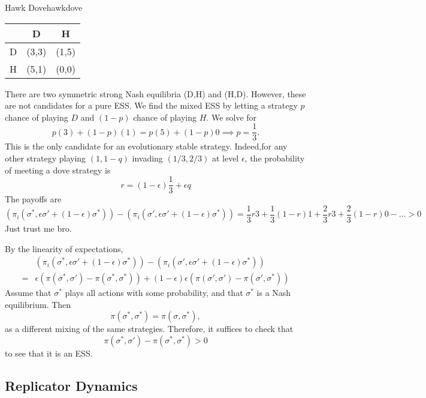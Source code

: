 \begin{aexample}{Hawk Dove}{hawkdove}
    \begin{center}
        \begin{tabular}{|c|c c|} 
            \hline &D& H \\
            
            \hline
            D&(3,3)&(1,5)\\
            \hline H&(5,1)&(0,0)
            \\ \hline
        \end{tabular}
    \end{center}

    There are two symmetric strong Nash equilibria (D,H) and (H,D). However, these are not candidates for a pure ESS. We find the mixed ESS by letting a strategy $p$ chance of playing $D$ and $(1-p)$ chance of playing $H$. We solve for \[
    p(3)+(1-p)(1)= p(5)+(1-p)0 \implies p=\frac{1}{3}.
    \]
    This is the only candidate for an evolutionary stable strategy. Indeed,for any other strategy playing $(1,1-q)$ invading $(1/3,2/3)$ at level $\epsilon$, the probability of meeting a dove strategy is \[
    r=(1-\epsilon)\frac{1}{3}+\epsilon q
    \]
    The payoffs are \[
        (\pi_i(\sigma^*,\epsilon\sigma'+(1-\epsilon)\sigma^*))-(\pi_i(\sigma',\epsilon\sigma'+(1-\epsilon)\sigma^*)) = \frac{1}{3}r3 + \frac{1}{3}(1-r)1+\frac{2}{3}r3+\frac{2}{3}(1-r)0 -\ldots >0
    \] Just trust me bro. 
\end{aexample}
By the linearity of expectations, \begin{align*}
    &(\pi_i(\sigma^*,\epsilon\sigma'+(1-\epsilon)\sigma^*))-(\pi_i(\sigma',\epsilon\sigma'+(1-\epsilon)\sigma^*)) \\=& \epsilon(\pi(\sigma^*,\sigma')-\pi(\sigma^*,\sigma^*)) + (1-\epsilon)\epsilon(\pi(\sigma',\sigma')-\pi(\sigma',\sigma^*)) 
\end{align*}
Assume that $\sigma^*$ plays all actions with some probability, and that $\sigma^*$ is a Nash equilibrium. Then \[
\pi(\sigma^*,\sigma^*)=\pi(\sigma,\sigma^*),
\]
as a different mixing of the same strategies. Therefore, it suffices to check that \[
    \pi(\sigma^*,\sigma')-\pi(\sigma^*,\sigma^*)>0
\]to see that it is an ESS.

\subsection*{Replicator Dynamics}
